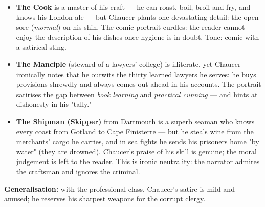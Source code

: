 \documentclass[11pt]{article}
\newcommand{\cle}[1]{{\popxbold\color{popdark}#1}}
\begin{document}
\begin{exemplebox}
\begin{itemize}
\item \textbf{The Cook} is a master of his craft — he can roast, boil, broil and fry, and knows his London ale — but Chaucer plants one devastating detail: the open sore (\emph{mormal}) on his shin. The comic portrait curdles: the reader cannot enjoy the description of his dishes once hygiene is in doubt. Tone: comic with a satirical sting.
\item \textbf{The Manciple} (steward of a lawyers' college) is illiterate, yet Chaucer ironically notes that he outwits the thirty learned lawyers he serves: he buys provisions shrewdly and always comes out ahead in his accounts. The portrait satirises the gap between \emph{book learning} and \emph{practical cunning} — and hints at dishonesty in his "tally."
\item \textbf{The Shipman (Skipper)} from Dartmouth is a superb seaman who knows every coast from Gotland to Cape Finisterre — but he steals wine from the merchants' cargo he carries, and in sea fights he sends his prisoners home "by water" (they are drowned). Chaucer's praise of his skill is genuine; the moral judgement is left to the reader. This is \cle{ironic neutrality}: the narrator admires the craftsman and ignores the criminal.
\end{itemize}
\textbf{Generalisation:} with the professional class, Chaucer's satire is mild and amused; he reserves his sharpest weapons for the corrupt clergy.
\end{exemplebox}
\end{document}
